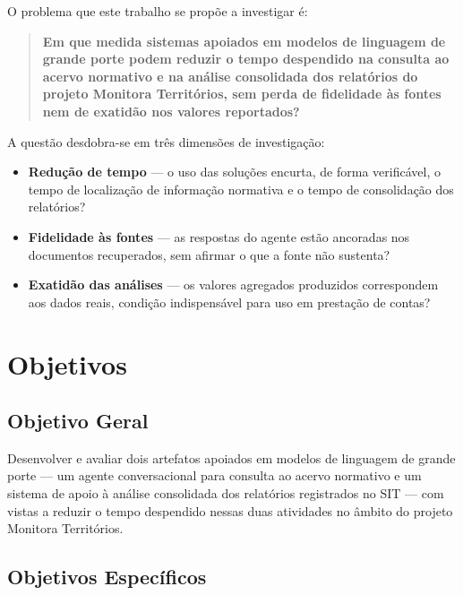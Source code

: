 O problema que este trabalho se propõe a investigar é:

\begin{quote}
\textbf{Em que medida sistemas apoiados em modelos de linguagem de grande porte
podem reduzir o tempo despendido na consulta ao acervo normativo e na análise
consolidada dos relatórios do projeto Monitora Territórios, sem perda de
fidelidade às fontes nem de exatidão nos valores reportados?}
\end{quote}

A questão desdobra-se em três dimensões de investigação:

\begin{itemize}
	\item \textbf{Redução de tempo} --- o uso das soluções encurta, de forma
	verificável, o tempo de localização de informação normativa e o tempo de
	consolidação dos relatórios?

	\item \textbf{Fidelidade às fontes} --- as respostas do agente estão
	ancoradas nos documentos recuperados, sem afirmar o que a fonte não sustenta?

	\item \textbf{Exatidão das análises} --- os valores agregados produzidos
	correspondem aos dados reais, condição indispensável para uso em prestação de
	contas?
\end{itemize}

\section{Objetivos}
\label{sec:introducao-objetivos}

\subsection{Objetivo Geral}

Desenvolver e avaliar dois artefatos apoiados em modelos de linguagem de grande
porte --- um agente conversacional para consulta ao acervo normativo e um
sistema de apoio à análise consolidada dos relatórios registrados no SIT --- com
vistas a reduzir o tempo despendido nessas duas atividades no âmbito do projeto
Monitora Territórios.

\subsection{Objetivos Específicos}

